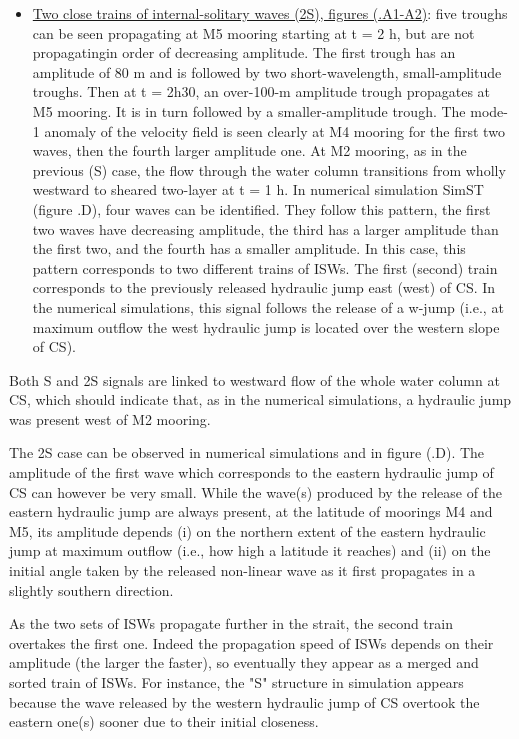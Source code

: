 \begin{itemize}
%
\item \underline{Two close trains of internal-solitary waves (2S), figures (.A1-A2)}: five troughs can be seen propagating at M5 mooring starting at t = 2 h, but are not propagatingin order of decreasing amplitude. The first trough has an amplitude of 80 m and is followed by two short-wavelength, small-amplitude troughs. Then at t = 2h30, an over-100-m amplitude trough propagates at M5 mooring. It is in turn followed by a smaller-amplitude trough. The mode-1 anomaly of the velocity field is seen clearly at M4 mooring for the first two waves, then the fourth larger amplitude one. At M2 mooring, as in the previous (S) case, the flow through the water column transitions from wholly westward to sheared two-layer at t = 1 h. In numerical simulation SimST (figure .D), four waves can be identified. They follow this pattern, the first two waves have decreasing amplitude, the third has a larger amplitude than the first two, and the fourth has a smaller amplitude. In this case, this pattern corresponds to two different trains of ISWs. The first (second) train corresponds to the previously  released hydraulic jump east (west) of CS. In the numerical simulations, this signal follows the release of a w-jump (i.e., at maximum outflow the west hydraulic jump is located over the western slope of CS).
\end{itemize}

Both S and 2S signals are linked to westward flow of the whole water column at CS, which should indicate that, as in the numerical simulations, a hydraulic jump was present west of M2 mooring.

The 2S case can be observed in numerical simulations and in figure (.D). The amplitude of the first wave which corresponds to the eastern hydraulic jump of CS can however be very small. While the wave(s) produced by the release of the eastern hydraulic jump are always present, at the latitude of moorings M4 and M5, its amplitude depends (i) on the northern extent of the eastern hydraulic jump at maximum outflow (i.e., how high a latitude it reaches) and (ii) on the initial angle taken by the released non-linear wave as it first propagates in a slightly southern direction.

As the two sets of ISWs propagate further in the strait, the second train overtakes the first one. Indeed the propagation speed of ISWs depends on their amplitude (the larger the faster), so eventually they appear as a merged and sorted train of ISWs. For instance, the "S" structure in simulation appears because the wave released by the western hydraulic jump of CS overtook the eastern one(s) sooner due to their initial closeness.

